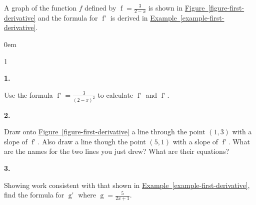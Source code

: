 \documentclass[12pt,]{book}
\theoremstyle{plain}
\theoremstyle{definition}
\numberwithin{equation}{section}
\newenvironment{exercisegroup}%
{\medskip\noindent}%
{\par\bigskip}%
\newlength{\exercisegroupindent}%
\newlength{\exercisegroupitemwidth}%
\newenvironment{exercisegrouplist}%
{\vspace{-\partopsep}%
\begin{adjustwidth}{\exercisegroupindent}{0em}}%
{\end{adjustwidth}%
\vspace{-\partopsep}%
\vspace{\baselineskip}}%
\newenvironment{exercisegroupbycol}[1]%
{\begin{exercisegrouplist}%
\vspace{-\multicolsep}%
\begin{multicols}{#1}%
\setlength{\parindent}{0em}%
\setlength{\exercisegroupitemwidth}{\linewidth}}%
{\end{multicols}%
\vspace{-\multicolsep}%
\end{exercisegrouplist}}%
\newenvironment{exercisegroupitem}[1]%
{\begin{minipage}[t]{\exercisegroupitemwidth}
\vspace{0pt}%
{\bfseries#1}%
\rule{0pt}{\baselineskip}}{\strut%
\end{minipage}%
\hspace{\columnsep}}%
\providecommand\phantomsection{}
\newcommand{\fe}[2]{\mathop{{#1}{\left(#2\right)}}}
\newcommand{\point}[2]{\left(#1,#2\right)}
\newcommand{\fd}[1]{#1'}
\begin{document}
\begin{exercisegroup}%
A graph of the function \(f\) defined by \(\fe{f}{x}=\frac{3}{2-x}\) is shown in \hyperref[figure-first-derivative]{Figure~\ref*{figure-first-derivative}} and the formula for \(\fe{\fd{f}}{x}\) is derived in \hyperref[example-first-derivative]{Example~\ref*{example-first-derivative}}.%
\begin{exercisegroupbycol}{1}%
\begin{exercisegroupitem}{1. }\phantomsection\hypertarget{exercise-128}{\null}
Use the formula \(\fe{\fd{f}}{x}=\frac{3}{(2-x)^2}\) to calculate \(\fe{\fd{f}}{1}\) and \(\fe{\fd{f}}{5}\).%
\end{exercisegroupitem}%
\par%
\begin{exercisegroupitem}{2. }\phantomsection\hypertarget{exercise-129}{\null}
Draw onto \hyperref[figure-first-derivative]{Figure~\ref*{figure-first-derivative}} a line through the point \(\point{1}{3}\) with a slope of \(\fe{\fd{f}}{1}\). Also draw a line though the point \(\point{5}{1}\) with a slope of \(\fe{\fd{f}}{5}\). What are the names for the two lines you just drew? What are their equations?%
\end{exercisegroupitem}%
\par%
\begin{exercisegroupitem}{3. }\phantomsection\hypertarget{exercise-130}{\null}
Showing work consistent with that shown in \hyperref[example-first-derivative]{Example~\ref*{example-first-derivative}}, find the formula for \(\fe{\fd{g}}{x}\) where \(\fe{g}{x}=\frac{5}{2x+1}\).%
\end{exercisegroupitem}%
\par%
\end{exercisegroupbycol}%
\end{exercisegroup}%
\end{document}
